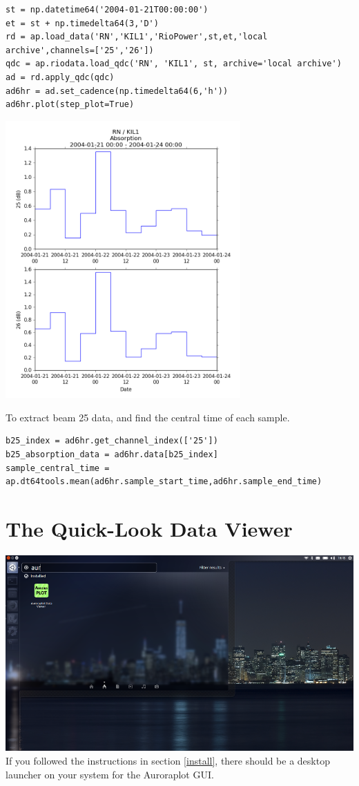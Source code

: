 \documentclass{article}
\begin{document}
\begin{lstlisting}[style=pythonstyle]
st = np.datetime64('2004-01-21T00:00:00')
et = st + np.timedelta64(3,'D')
rd = ap.load_data('RN','KIL1','RioPower',st,et,'local archive',channels=['25','26'])
qdc = ap.riodata.load_qdc('RN', 'KIL1', st, archive='local archive')
ad = rd.apply_qdc(qdc)
ad6hr = ad.set_cadence(np.timedelta64(6,'h'))
ad6hr.plot(step_plot=True)
\end{lstlisting}

\includegraphics[width=9cm]{images/figure_6.png}

To extract beam 25 data, and find the central time of each sample.

\begin{lstlisting}[style=pythonstyle]
b25_index = ad6hr.get_channel_index(['25'])
b25_absorption_data = ad6hr.data[b25_index]
sample_central_time = ap.dt64tools.mean(ad6hr.sample_start_time,ad6hr.sample_end_time) 
\end{lstlisting}


\section{The Quick-Look Data Viewer}
\hskip -1cm
\includegraphics[width=14cm]{images/dv-0.png}
If you followed the instructions in section \ref{install}, there should be a desktop launcher on your system for the Auroraplot GUI.
\end{document}
